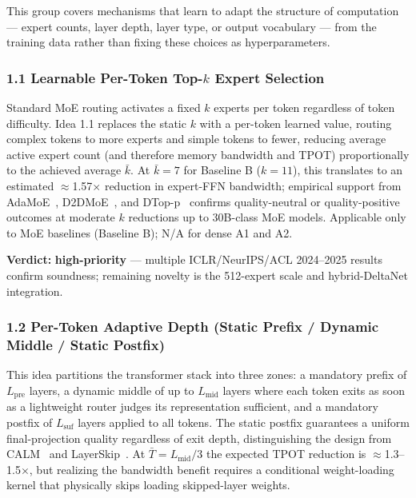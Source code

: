 \documentclass[11pt]{article}
\begin{document}
This group covers mechanisms that learn to adapt the structure of computation --- expert counts, layer depth, layer type, or output vocabulary --- from the training data rather than fixing these choices as hyperparameters.

\subsubsection{1.1 Learnable Per-Token Top-$k$ Expert Selection}
\label{sec:idea_1_1}

Standard MoE routing activates a fixed $k$ experts per token regardless of token difficulty.
Idea 1.1 replaces the static $k$ with a per-token learned value, routing complex tokens to more experts and simple tokens to fewer, reducing average active expert count (and therefore memory bandwidth and TPOT) proportionally to the achieved average $\bar{k}$.
At $\bar{k} = 7$ for Baseline B ($k = 11$), this translates to an estimated $\approx$1.57$\times$ reduction in expert-FFN bandwidth; empirical support from AdaMoE~\cite{Zeng2024AdaMoE}, D2DMoE~\cite{Szatkowski2024D2DMoE}, and DTop-p~\cite{Jin2025DTopP} confirms quality-neutral or quality-positive outcomes at moderate $k$ reductions up to 30B-class MoE models.
Applicable only to MoE baselines (Baseline B); N/A for dense A1 and A2.

\textbf{Verdict:} \textbf{high-priority} --- multiple ICLR/NeurIPS/ACL 2024--2025 results confirm soundness; remaining novelty is the 512-expert scale and hybrid-DeltaNet integration.

\subsubsection{1.2 Per-Token Adaptive Depth (Static Prefix / Dynamic Middle / Static Postfix)}
\label{sec:idea_1_2}

This idea partitions the transformer stack into three zones: a mandatory prefix of $L_{\text{pre}}$ layers, a dynamic middle of up to $L_{\text{mid}}$ layers where each token exits as soon as a lightweight router judges its representation sufficient, and a mandatory postfix of $L_{\text{suf}}$ layers applied to all tokens.
The static postfix guarantees a uniform final-projection quality regardless of exit depth, distinguishing the design from CALM~\cite{Schuster2022CALM} and LayerSkip~\cite{Elhoushi2024LayerSkip}.
At $\bar{T} = L_{\text{mid}}/3$ the expected TPOT reduction is $\approx$1.3--1.5$\times$, but realizing the bandwidth benefit requires a conditional weight-loading kernel that physically skips loading skipped-layer weights.
\end{document}
